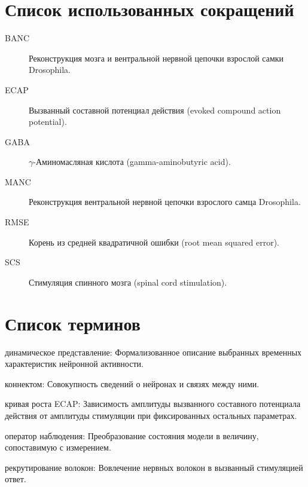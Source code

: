 \chapter*{Список использованных сокращений}
\begin{description}
\item[BANC] Реконструкция мозга и вентральной нервной цепочки взрослой самки Drosophila.
\item[ECAP] Вызванный составной потенциал действия (evoked compound action potential).
\item[GABA] $\gamma$-Аминомасляная кислота (gamma-aminobutyric acid).
\item[MANC] Реконструкция вентральной нервной цепочки взрослого самца Drosophila.
\item[RMSE] Корень из средней квадратичной ошибки (root mean squared error).
\item[SCS] Стимуляция спинного мозга (spinal cord stimulation).
\end{description}

\chapter*{Список терминов}
\noindent динамическое представление: Формализованное описание выбранных временных характеристик нейронной активности.\par
\noindent коннектом: Совокупность сведений о нейронах и связях между ними.\par
\noindent кривая роста ECAP: Зависимость амплитуды вызванного составного потенциала действия от амплитуды стимуляции при фиксированных остальных параметрах.\par
\noindent оператор наблюдения: Преобразование состояния модели в величину, сопоставимую с измерением.\par
\noindent рекрутирование волокон: Вовлечение нервных волокон в вызванный стимуляцией ответ.\par
